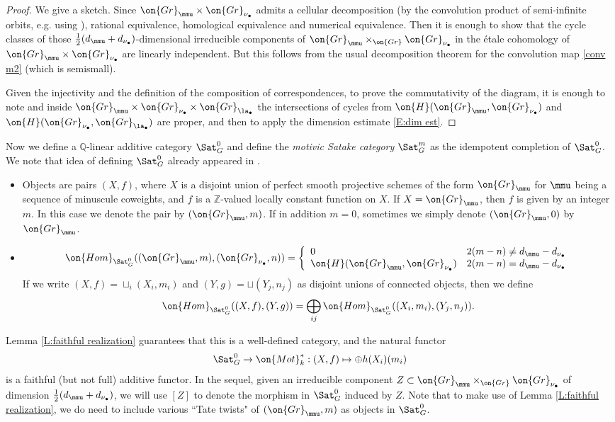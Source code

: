 \documentclass[11pt]{amsart}
\theoremstyle{definition}
\theoremstyle{definition}
\theoremstyle{definition}
\numberwithin{equation}{subsection}
\newcommand{\bQ}{{\mathbb Q}}
\newcommand{\bZ}{{\mathbb Z}}
\newcommand{\Gr}{{\on{Gr}}}
\newcommand{\Hom}{{\on{Hom}}}
\begin{document}
\begin{proof}
We give a sketch.
Since $\Gr_\mmu\times\Gr_{\nu_\bullet}$ admits a cellular decomposition (by the convolution product of semi-infinite orbits, e.g. using \cite[\S 3.2.5, \S 3.2.6]{XZ}), rational equivalence, homological equivalence and numerical equivalence. Then it is enough to show that the cycle classes of those $\frac{1}{2}(d_{\mmu}+d_{\nu_\bullet})$-dimensional irreducible components of $\Gr_{\mmu}\times_\Gr\Gr_{\nu_\bullet}$ in the \'etale cohomology of $\Gr_{\mmu}\times\Gr_{\nu_\bullet}$ are linearly independent. But this follows from the usual decomposition theorem for the convolution map \eqref{conv m2} (which is semismall). 


Given the injectivity and the definition of the composition of correspondences, to prove the commutativity of the diagram, it is enough to note and inside $\Gr_{\mmu}\times\Gr_{\nu_\bullet}\times\Gr_{\la_\bullet}$ the intersections of cycles from $\on{H}(\Gr_{\mmu},\Gr_{\nu_\bullet})$ and $\on{H}(\Gr_{\nu_\bullet},\Gr_{\la_\bullet})$ are proper, and then to apply the dimension estimate \eqref{E:dim est}.
\end{proof}



Now we define a $\bQ$-linear additive category $\Sat_G^{0}$ and define the \emph{motivic Satake category} $\Sat_G^m$ as the idempotent completion of $\Sat_G^{0}$. We note that idea of defining $\Sat_G^0$ already appeared in \cite[\S 4.3]{FKK}. 
\begin{itemize}
\item Objects are pairs $(X,f)$, where $X$ is a disjoint union of perfect smooth projective schemes of the form $\Gr_\mmu$ for $\mmu$ being a sequence of minuscule coweights, and $f$ is a $\bZ$-valued locally constant function on $X$. If $X=\Gr_\mmu$, then $f$ is given by an integer $m$. In this case we denote the pair by $(\Gr_\mmu,m)$. If in addition $m=0$, sometimes we simply denote $(\Gr_\mmu,0)$ by $\Gr_\mmu$.
\item \[\Hom_{\Sat_G^0}((\Gr_{\mmu},m),(\Gr_{\nu_\bullet},n))=\left\{\begin{array}{ll}0 & 2(m-n)\neq d_\mmu-d_{\nu_\bullet}\\
\on{H}(\Gr_{\mmu},\Gr_{\nu_\bullet}) & 2(m-n)=d_\mmu-d_{\nu_\bullet} \end{array}\right.\] 
If we write $(X,f)=\sqcup_i (X_i,m_i)$ and $(Y,g)=\sqcup (Y_j,n_j)$ as disjoint unions of connected objects, then we define
$$\Hom_{\Sat_G^0}((X,f),(Y,g))=\bigoplus_{ij}\Hom_{\Sat_G^0}((X_i,m_i),(Y_j,n_j)).$$
\end{itemize}
Lemma \ref{L:faithful realization} guarantees that this is a well-defined category, and the natural functor 
$$\Sat_G^0\to \on{Mot}_k^*: (X,f)\mapsto \oplus h(X_i)(m_i)$$  is a faithful (but not full) additive functor.
In the sequel, given an irreducible component $Z\subset \Gr_{\mmu}\times_\Gr\Gr_{\nu_\bullet}$ of dimension $\frac{1}{2}(d_{\mmu}+d_{\nu_\bullet})$, we will use $[Z]$ to denote the morphism in $\Sat^0_G$ induced by $Z$. Note that to make use of Lemma \ref{L:faithful realization}, we do need to include various ``Tate twists" of $(\Gr_\mmu,m)$ as objects in $\Sat^0_G$. 
\end{document}
